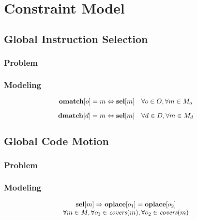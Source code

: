 %

\chapter{Constraint Model}

\section{Global Instruction Selection}
\subsection{Problem}
\subsection{Modeling}

\begin{equation}
  \mVar{omatch}[o] = m \mEq \mVar{sel}[m]
  \mQuantSep
  \forall o \in \mOpSet,
  \forall m \in \mMatchSet[o]
  \labelEquation{operation-coverage}
\end{equation}

\begin{equation}
  \mVar{dmatch}[d] = m \mEq \mVar{sel}[m]
  \mQuantSep
  \forall d \in \mDataSet,
  \forall m \in \mMatchSet[d]
  \labelEquation{data-definitions}
\end{equation}



\section{Global Code Motion}
\subsection{Problem}
\subsection{Modeling}

\begin{equation}
  \begin{array}{c}
    \mVar{sel}[m] \mImp \mVar{oplace}[o_1] = \mVar{oplace}[o_2] \\
    \forall m \in \mMatchSet,
    \forall o_1 \in \mCovers(m),
    \forall o_2 \in \mCovers(m)
  \end{array}
  \labelEquation{operation-placement}
\end{equation}

